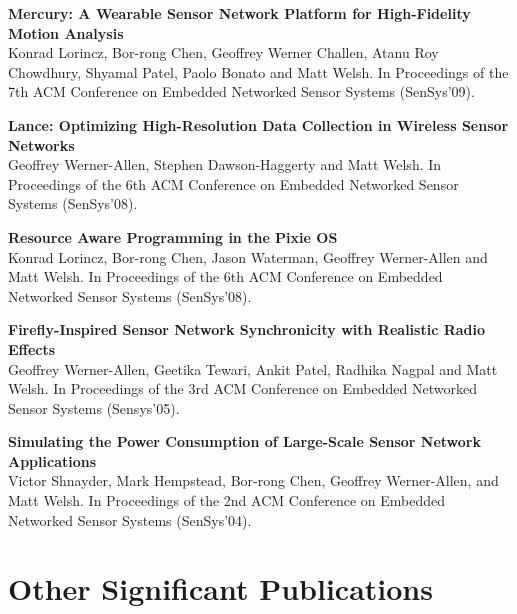 \documentclass[11pt,letterpaper]{article}
\begin{document}
\begin{list}{}{\leftmargin=1em}

\item \textbf{Mercury: A Wearable Sensor Network Platform for High-Fidelity
Motion Analysis}\\
Konrad Lorincz, Bor-rong Chen, Geoffrey Werner Challen, Atanu Roy Chowdhury,
Shyamal Patel, Paolo Bonato and Matt Welsh. In Proceedings of the 7th ACM
Conference on Embedded Networked Sensor Systems (SenSys'09).

\item \textbf{Lance: Optimizing High-Resolution Data Collection in Wireless
Sensor Networks}\\
Geoffrey Werner-Allen, Stephen Dawson-Haggerty and Matt Welsh. In Proceedings
of the 6th ACM Conference on Embedded Networked Sensor Systems (SenSys'08).

\item \textbf{Resource Aware Programming in the Pixie OS}\\
Konrad Lorincz, Bor-rong Chen, Jason Waterman, Geoffrey Werner-Allen and Matt
Welsh. In Proceedings of the 6th ACM Conference on Embedded Networked
Sensor Systems (SenSys'08).

\item \textbf{Firefly-Inspired Sensor Network Synchronicity with Realistic
Radio Effects}\\
Geoffrey Werner-Allen, Geetika Tewari, Ankit Patel, Radhika Nagpal and Matt
Welsh. In Proceedings of the 3rd ACM Conference on Embedded Networked Sensor
Systems (Sensys'05).

\item \textbf{Simulating the Power Consumption of Large-Scale Sensor Network
Applications}\\
Victor Shnayder, Mark Hempstead, Bor-rong Chen, Geoffrey Werner-Allen, and
Matt Welsh. In Proceedings of the 2nd ACM Conference on Embedded Networked
Sensor Systems (SenSys'04).

\end{list}

\section*{Other Significant Publications}
\end{document}
